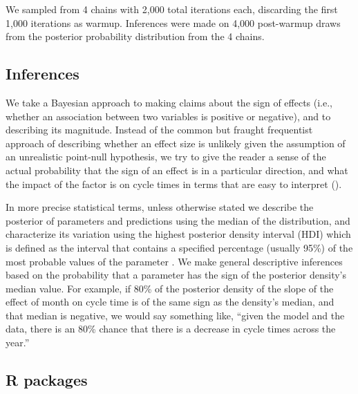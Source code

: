 \documentclass[manuscript,screen,review]{acmart}
\begin{document}
We sampled from 4 chains with 2,000 total iterations each, discarding
the first 1,000 iterations as warmup. Inferences were made on 4,000
post-warmup draws from the posterior probability distribution from the 4
chains.

\subsection{Inferences}\label{inferences}

We take a Bayesian approach to making claims about the sign of effects
(i.e., whether an association between two variables is positive or
negative), and to describing its magnitude. Instead of the common but
fraught frequentist approach of describing whether an effect size is
unlikely given the assumption of an unrealistic point-null hypothesis,
we try to give the reader a sense of the actual probability that the
sign of an effect is in a particular direction, and what the impact of
the factor is on cycle times in terms that are easy to interpret
(\citet{GelmanPowerCalculationsAssessing2014}).

In more precise statistical terms, unless otherwise stated we describe
the posterior of parameters and predictions using the median of the
distribution, and characterize its variation using the highest posterior
density interval (HDI) which is defined as the interval that contains a
specified percentage (usually 95\%) of the most probable values of the
parameter \citep{kruschkeRejectingAcceptingParameter}. We make general
descriptive inferences based on the probability that a parameter has the
sign of the posterior density's median value. For example, if 80\% of
the posterior density of the slope of the effect of month on cycle time
is of the same sign as the density's median, and that median is
negative, we would say something like, ``given the model and the data,
there is an 80\% chance that there is a decrease in cycle times across
the year.''

\subsection{R packages}\label{r-packages}
\end{document}
